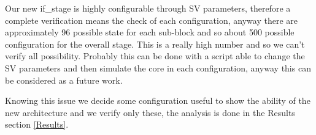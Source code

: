 {{{            Our new if\_stage is highly configurable through SV parameters, therefore a complete verification means the check of each configuration, anyway there are approximately 96 possible state for each sub-block and so about 500 possible configuration for the overall stage.
            This is a really high number and so we can't verify all possibility. 
            Probably this can be done with a script able to change the SV parameters and then simulate the core in each configuration, anyway this can be considered as a future work. 
            
            
            Knowing this issue we decide some configuration useful to show the ability of the new architecture and we verify only these, the analysis is done in the Results section \ref{Results}. 
            
        }
        
}}
